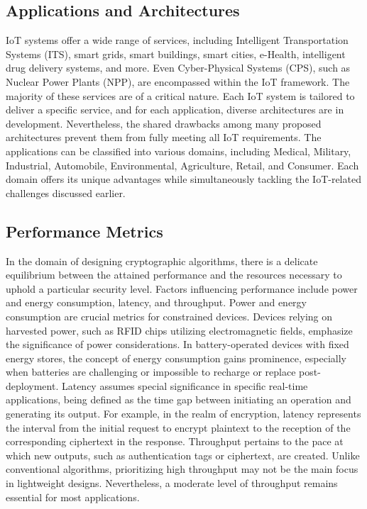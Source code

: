 \documentclass[conference,compsoc]{IEEEtran}
\begin{document}
\subsection{Applications and Architectures}
IoT systems offer a wide range of services, including Intelligent Transportation Systems (ITS), smart grids, smart buildings, smart cities, e-Health, intelligent drug delivery systems, and more. Even Cyber-Physical Systems (CPS), such as Nuclear Power Plants (NPP), are encompassed within the IoT framework. The majority of these services are of a critical nature. Each IoT system is tailored to deliver a specific service, and for each application, diverse architectures are in development. 
Nevertheless, the shared drawbacks among many proposed architectures prevent them from fully meeting all IoT requirements. The applications can be classified into various domains, including Medical, Military, Industrial, Automobile, Environmental, Agriculture, Retail, and Consumer. Each domain offers its unique advantages while simultaneously tackling the IoT-related challenges discussed earlier.
\subsection{Performance Metrics} 
In the domain of designing cryptographic algorithms, there is a delicate equilibrium between the attained performance and the resources necessary to uphold a particular security level. Factors influencing performance include power and energy consumption, latency, and throughput.
Power and energy consumption are crucial metrics for constrained devices. Devices relying on harvested power, such as RFID chips utilizing electromagnetic fields, emphasize the significance of power considerations. In battery-operated devices with fixed energy stores, the concept of energy consumption gains prominence, especially when batteries are challenging or impossible to recharge or replace post-deployment.
Latency assumes special significance in specific real-time applications, being defined as the time gap between initiating an operation and generating its output. For example, in the realm of encryption, latency represents the interval from the initial request to encrypt plaintext to the reception of the corresponding ciphertext in the response.
Throughput pertains to the pace at which new outputs, such as authentication tags or ciphertext, are created. Unlike conventional algorithms, prioritizing high throughput may not be the main focus in lightweight designs. Nevertheless, a moderate level of throughput remains essential for most applications.
\end{document}
